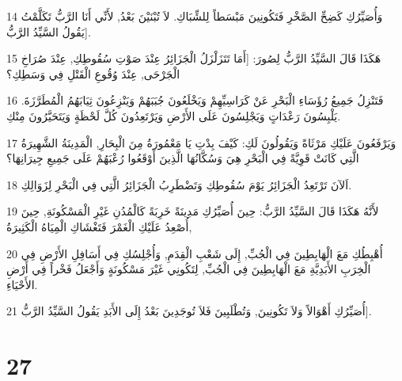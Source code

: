 \par 14 وَأُصَيِّرُكِ كَضِحِّ الصَّخْرِ فَتَكُونِينَ مَبْسَطاً لِلشِّبَاكِ. لاَ تُبْنَيْنَ بَعْدُ, لأَنِّي أَنَا الرَّبُّ تَكَلَّمْتُ يَقُولُ السَّيِّدُ الرَّبُّ].
\par 15 هَكَذَا قَالَ السَّيِّدُ الرَّبُّ لِصُورَ: [أَمَا تَتَزَلْزَلُ الْجَزَائِرُ عِنْدَ صَوْتِ سُقُوطِكِ, عِنْدَ صُرَاخِ الْجَرْحَى, عِنْدَ وُقُوعِ الْقَتْلِ فِي وَسَطِكِ؟
\par 16 فَتَنْزِلُ جَمِيعُ رُؤَسَاءِ الْبَحْرِ عَنْ كَرَاسِيِّهِمْ وَيَخْلَعُونَ جُبَبَهُمْ وَيَنْزِعُونَ ثِيَابَهُمُ الْمُطَرَّزَةَ. يَلْبِسُونَ رَعْدَاتٍ وَيَجْلِسُونَ عَلَى الأَرْضِ وَيَرْتَعِدُونَ كُلَّ لَحْظَةٍ وَيَتَحَيَّرُونَ مِنْكِ.
\par 17 وَيَرْفَعُونَ عَلَيْكِ مَرْثَاةً وَيَقُولُونَ لَكِ: كَيْفَ بِدْتِ يَا مَعْمُورَةُ مِنَ الْبِحَارِ, الْمَدِينَةُ الشَّهِيرَةُ الَّتِي كَانَتْ قَوِيَّةً فِي الْبَحْرِ هِيَ وَسُكَّانُهَا الَّذِينَ أَوْقَعُوا رُعْبَهُمْ عَلَى جَمِيعِ جِيرَانِهَا؟
\par 18 اَلآنَ تَرْتَعِدُ الْجَزَائِرُ يَوْمَ سُقُوطِكِ وَتَضْطَرِبُ الْجَزَائِرُ الَّتِي فِي الْبَحْرِ لِزَوَالِكِ.
\par 19 لأَنَّهُ هَكَذَا قَالَ السَّيِّدُ الرَّبُّ: حِينَ أُصَيِّرُكِ مَدِينَةً خَرِبَةً كَالْمُدُنِ غَيْرِ الْمَسْكُونَةِ, حِينَ أُصْعِدُ عَلَيْكِ الْغَمْرَ فَتَغْشَاكِ الْمِيَاهُ الْكَثِيرَةُ,
\par 20 أُهْبِطُكِ مَعَ الْهَابِطِينَ فِي الْجُبِّ, إِلَى شَعْبِ الْقِدَمِ, وَأُجْلِسُكِ فِي أَسَافِلِ الأَرْضِ فِي الْخِرَبِ الأَبَدِيَّةِ مَعَ الْهَابِطِينَ فِي الْجُبِّ, لِتَكُونِي غَيْرَ مَسْكُونَةٍ وَأَجْعَلُ فَخْراً فِي أَرْضِ الأَحْيَاءِ.
\par 21 أُصَيِّرُكِ أَهْوَالاً وَلاَ تَكُونِينَ, وَتُطْلَبِينَ فَلاَ تُوجَدِينَ بَعْدُ إِلَى الأَبَدِ يَقُولُ السَّيِّدُ الرَّبُّ].

\chapter{27}

